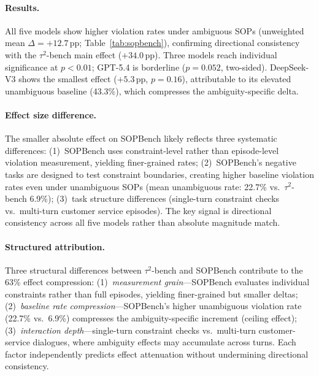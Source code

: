 \paragraph{Results.} All five models show higher violation rates under ambiguous SOPs (unweighted mean $\Delta = +12.7$\,pp; Table~\ref{tab:sopbench}), confirming directional consistency with the $\tau^2$-bench main effect ($+34.0$\,pp). Three models reach individual significance at $p < 0.01$; GPT-5.4 is borderline ($p = 0.052$, two-sided). DeepSeek-V3 shows the smallest effect ($+5.3$\,pp, $p = 0.16$), attributable to its elevated unambiguous baseline (43.3\%), which compresses the ambiguity-specific delta.

\paragraph{Effect size difference.} The smaller absolute effect on SOPBench likely reflects three systematic differences: (1)~SOPBench uses constraint-level rather than episode-level violation measurement, yielding finer-grained rates; (2)~SOPBench's negative tasks are designed to test constraint boundaries, creating higher baseline violation rates even under unambiguous SOPs (mean unambiguous rate: 22.7\% vs.\ $\tau^2$-bench 6.9\%); (3)~task structure differences (single-turn constraint checks vs.\ multi-turn customer service episodes). The key signal is directional consistency across all five models rather than absolute magnitude match.

\paragraph{Structured attribution.} Three structural differences between $\tau^2$-bench and SOPBench contribute to the 63\% effect compression: (1)~\emph{measurement grain}---SOPBench evaluates individual constraints rather than full episodes, yielding finer-grained but smaller deltas; (2)~\emph{baseline rate compression}---SOPBench's higher unambiguous violation rate (22.7\% vs.\ 6.9\%) compresses the ambiguity-specific increment (ceiling effect); (3)~\emph{interaction depth}---single-turn constraint checks vs.\ multi-turn customer-service dialogues, where ambiguity effects may accumulate across turns. Each factor independently predicts effect attenuation without undermining directional consistency.

